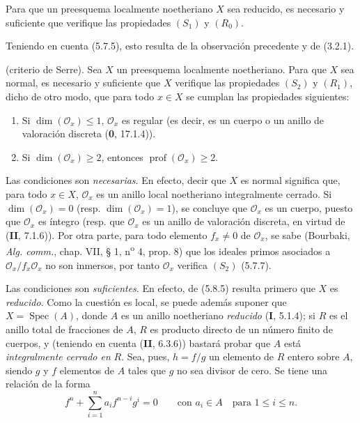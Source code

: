 \begin{proposition}[5.8.5]
\label{IV.2.s5.8.5-fr}
Para que un preesquema localmente noetheriano $X$ sea reducido, es necesario
y suficiente que verifique las propiedades $(S_1)$ y $(R_0)$.
\end{proposition}

Teniendo en cuenta (5.7.5), esto resulta de la observación precedente y de
(3.2.1).

\begin{theorem}[5.8.6]
(criterio de Serre). Sea $X$ un preesquema localmente noetheriano. Para que
$X$ sea normal, es necesario y suficiente que $X$ verifique las propiedades
$(S_2)$ y $(R_1)$, dicho de otro modo, que para todo $x\in X$ se cumplan las
propiedades siguientes:
\begin{enumerate}
\item[\textup{(i)}] Si $\dim(\mathcal O_x)\leq1$, $\mathcal O_x$ es regular
\textup{(es decir, es un} cuerpo \textup{o un} anillo de valoración discreta \textup{(\textbf{0}, 17.1.4))}.
\item[\textup{(ii)}] Si $\dim(\mathcal O_x)\geq2$, entonces
$\operatorname{prof}(\mathcal O_x)\geq2$.
\end{enumerate}
\end{theorem}

Las condiciones son \emph{necesarias}. En efecto, decir que $X$ es normal significa
que, para todo $x\in X$, $\mathcal O_x$ es un anillo local noetheriano
integralmente cerrado. Si $\dim(\mathcal O_x)=0$ (resp.
$\dim(\mathcal O_x)=1$), se concluye que $\mathcal O_x$ es un cuerpo, puesto
que $\mathcal O_x$ es íntegro (resp. que $\mathcal O_x$ es un anillo de
valoración discreta, en virtud de (\textbf{II}, 7.1.6)). Por otra parte, para todo
elemento $f_x\neq0$ de $\mathcal O_x$, se sabe (Bourbaki, \emph{Alg. comm.},
chap. VII, § 1, n\textsuperscript{o} 4, prop. 8) que los ideales primos asociados a
$\mathcal O_x/f_x\mathcal O_x$ no son inmersos, por tanto $\mathcal O_x$
verifica $(S_2)$ (5.7.7).

Las condiciones son \emph{suficientes}. En efecto, de (5.8.5) resulta primero que
$X$ es \emph{reducido}. Como la cuestión es local, se puede además suponer que
$X=\operatorname{Spec}(A)$, donde $A$ es un anillo noetheriano \emph{reducido}
(\textbf I, 5.1.4); si $R$ es el anillo total de fracciones de $A$, $R$ es producto
directo de un número finito de cuerpos, y (teniendo en cuenta (\textbf{II}, 6.3.6))
bastará probar que $A$ está \emph{integralmente cerrado en} $R$. Sea, pues, $h=f/g$
un elemento de $R$ entero sobre $A$, siendo $g$ y $f$ elementos de $A$ tales
que $g$ no sea divisor de cero. Se tiene una relación de la forma
\begin{equation}
f^n+\sum_{i=1}^n a_i f^{n-i}g^i=0
\qquad\text{con }a_i\in A\quad\text{para }1\leq i\leq n.
\tag{5.8.6.1}\label{IV.2.s5.8.6.1-fr}
\end{equation}

